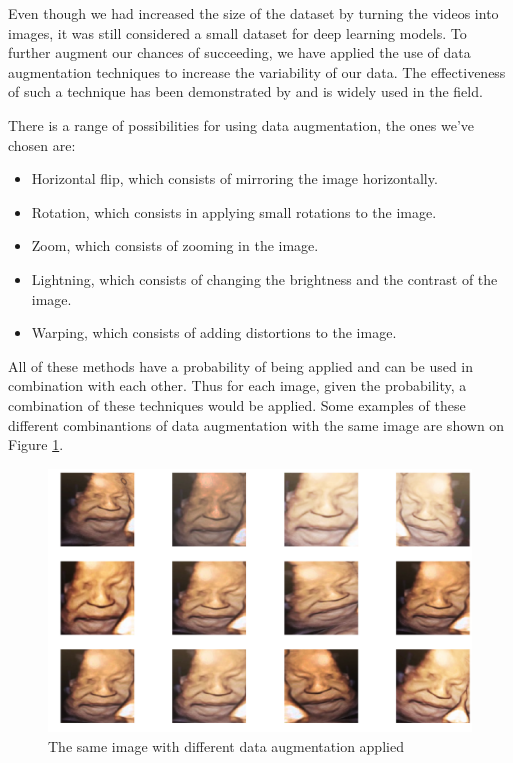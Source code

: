 Even though we had increased the size of the dataset by turning the videos into images, it was still considered a small dataset for deep learning models. To further augment our chances of succeeding, we have applied the use of data augmentation techniques to increase the variability of our data. The effectiveness of such a technique has been demonstrated by \cite{abs-1712-04621} and is widely used in the field.

There is a range of possibilities for using data augmentation, the ones we've chosen are:

\begin{itemize}
    \item Horizontal flip, which consists of mirroring the image horizontally. 
    \item Rotation, which consists in applying small rotations to the image.
    \item Zoom, which consists of zooming in the image.
    \item Lightning, which consists of changing the brightness and the contrast of the image.
    \item Warping, which consists of adding distortions to the image. 
\end{itemize}

All of these methods have a probability of being applied and can be used in combination with each other. Thus for each image, given the probability, a combination of these techniques would be applied. Some examples of these different combinantions of data augmentation with the same image are shown on Figure \ref{fig:data_augmentation}.

\begin{figure}[h!tp]
    \centering
    \includegraphics[width=.9\textwidth]{imgs/chap3_data_augmentation.png}
    \caption{The same image with different data augmentation applied}
    \label{fig:data_augmentation}
\end{figure}

